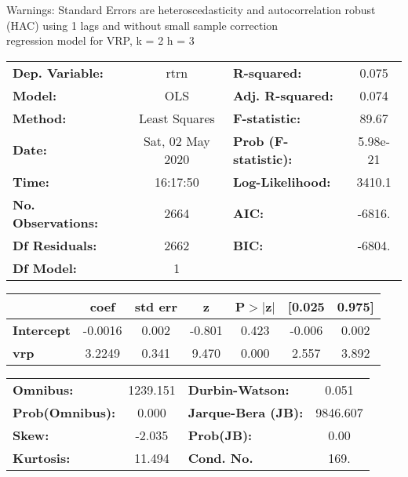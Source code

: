 Warnings: \newline
 [1] Standard Errors are heteroscedasticity and autocorrelation robust (HAC) using 1 lags and without small sample correction\\ 

regression model for VRP, k = 2 h = 3\begin{center}
\begin{tabular}{lclc}
\toprule
\textbf{Dep. Variable:}    &       rtrn       & \textbf{  R-squared:         } &     0.075   \\
\textbf{Model:}            &       OLS        & \textbf{  Adj. R-squared:    } &     0.074   \\
\textbf{Method:}           &  Least Squares   & \textbf{  F-statistic:       } &     89.67   \\
\textbf{Date:}             & Sat, 02 May 2020 & \textbf{  Prob (F-statistic):} &  5.98e-21   \\
\textbf{Time:}             &     16:17:50     & \textbf{  Log-Likelihood:    } &    3410.1   \\
\textbf{No. Observations:} &        2664      & \textbf{  AIC:               } &    -6816.   \\
\textbf{Df Residuals:}     &        2662      & \textbf{  BIC:               } &    -6804.   \\
\textbf{Df Model:}         &           1      & \textbf{                     } &             \\
\bottomrule
\end{tabular}
\begin{tabular}{lcccccc}
                   & \textbf{coef} & \textbf{std err} & \textbf{z} & \textbf{P$> |$z$|$} & \textbf{[0.025} & \textbf{0.975]}  \\
\midrule
\textbf{Intercept} &      -0.0016  &        0.002     &    -0.801  &         0.423        &       -0.006    &        0.002     \\
\textbf{vrp}       &       3.2249  &        0.341     &     9.470  &         0.000        &        2.557    &        3.892     \\
\bottomrule
\end{tabular}
\begin{tabular}{lclc}
\textbf{Omnibus:}       & 1239.151 & \textbf{  Durbin-Watson:     } &    0.051  \\
\textbf{Prob(Omnibus):} &   0.000  & \textbf{  Jarque-Bera (JB):  } & 9846.607  \\
\textbf{Skew:}          &  -2.035  & \textbf{  Prob(JB):          } &     0.00  \\
\textbf{Kurtosis:}      &  11.494  & \textbf{  Cond. No.          } &     169.  \\
\bottomrule
\end{tabular}
\end{center}

